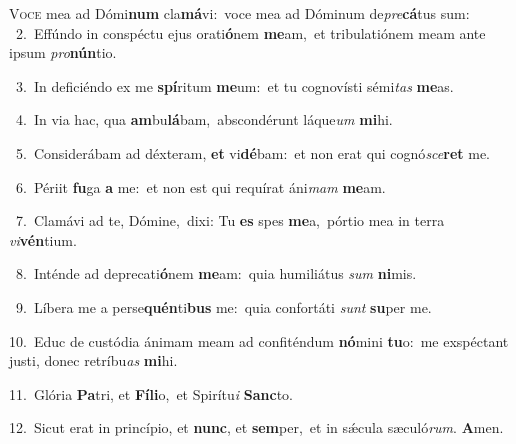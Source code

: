 \lettrine{\initial\textcolor{\initialcolor}{V}}{oce} mea ad Dómi\textbf{num} cla\-\textbf{má}\-vi:~\star voce mea ad Dóminum de\-\textit{pre}\-\textbf{cá}tus sum:\\
{\numbfont\textcolor{\numbcolor}{~2.}}~Effúndo in conspéctu ejus orati\-\textbf{ó}\-nem \textbf{me}\-am,~\star et tribulatiónem meam ante ipsum \textit{pro}\-\textbf{nún}tio.\par
{\numbfont\textcolor{\numbcolor}{~3.}}~In deficiéndo ex me \textbf{spí}\-ritum \textbf{me}\-um:~\star et tu cognovísti sémi\textit{tas} \textbf{me}\-as.\par
{\numbfont\textcolor{\numbcolor}{~4.}}~In via hac, qua \textbf{am}\-bu\-\textbf{lá}\-bam,~\star abscondérunt láque\textit{um} \textbf{mi}\-hi.\par
{\numbfont\textcolor{\numbcolor}{~5.}}~Considerábam ad déxteram, \textbf{et} vi\-\textbf{dé}\-bam:~\star et non erat qui cognó\-\textit{sce}\-\textbf{ret} me.\par
{\numbfont\textcolor{\numbcolor}{~6.}}~Périit \textbf{fu}\-ga \textbf{a} me:~\star et non est qui requírat áni\textit{mam} \textbf{me}\-am.\par
{\numbfont\textcolor{\numbcolor}{~7.}}~Clamávi ad te, Dómine,~\dagger dixi: Tu \textbf{es} spes \textbf{me}\-a,~\star pórtio mea in terra \textit{vi}\-\textbf{vén}tium.\par
{\numbfont\textcolor{\numbcolor}{~8.}}~Inténde ad deprecati\-\textbf{ó}\-nem \textbf{me}\-am:~\star quia humiliátus \textit{sum} \textbf{ni}\-mis.\par
{\numbfont\textcolor{\numbcolor}{~9.}}~Líbera me a perse\-\textbf{quén}\-ti\textbf{bus} me:~\star quia confortáti \textit{sunt} \textbf{su}\-per me.\par
{\numbfont\textcolor{\numbcolor}{10.}}~Educ de custódia ánimam meam ad confiténdum \textbf{nó}\-mini \textbf{tu}\-o:~\star me exspéctant justi, donec retríbu\textit{as} \textbf{mi}\-hi.\par
{\numbfont\textcolor{\numbcolor}{11.}}~Glória \textbf{Pa}\-tri, et \textbf{Fí}\-\textbf{li}o,~\star et Spirítu\textit{i} \textbf{Sanc}\-to.\par
{\numbfont\textcolor{\numbcolor}{12.}}~Sicut erat in princípio, et \textbf{nunc}\-, et \textbf{sem}\-per,~\star et in sǽcula sæculó\-\textit{rum}\-. \textbf{A}\-men.\par
